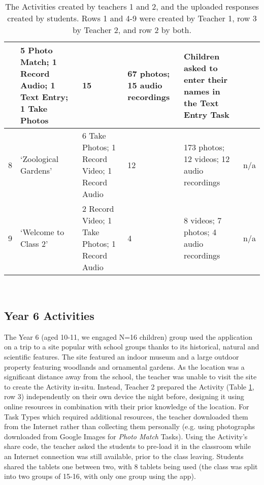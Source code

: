 \begin{table}[]
\begin{tabularx}{\linewidth}{ 
| p{3mm} 
| >{\raggedright\arraybackslash}X 
| >{\raggedright\arraybackslash}X 
| p{13mm}
| >{\raggedright\arraybackslash}X 
| >{\raggedright\arraybackslash}X 
|}
    & \footnotesize 5 Photo Match; 1 Record Audio; 1 Text Entry; 1 Take Photos
    & \footnotesize 15 
    & \footnotesize 67 photos; 15 audio recordings
    & \footnotesize Children asked to enter their names in the Text Entry Task\\
\hline
    \small 8 
    & \footnotesize `Zoological Gardens' 
    & \footnotesize 6 Take Photos; 1 Record Video; 1 Record Audio
    & \footnotesize 12 
    & \footnotesize 173 photos; 12 videos; 12 audio recordings
    & \footnotesize n/a\\
\hline
    \small 9 
    & \footnotesize `Welcome to Class 2' 
    & \footnotesize 2 Record Video; 1 Take Photos; 1 Record Audio
    & \footnotesize 4 
    & \footnotesize 8 videos; 7 photos; 4 audio recordings
    & \footnotesize n/a\\
\hline
\end{tabularx}
    \caption[The Activities created by teachers 1 and 2, and the uploaded responses created by students.]{The Activities created by teachers 1 and 2, and the uploaded responses created by students. Rows 1 and 4-9 were created by Teacher 1, row 3 by Teacher 2, and row 2 by both.}~\label{tab:TeacherActivities}
\end{table}

\subsection{Year 6 Activities}

The Year 6 (aged 10-11, we engaged N=16 children) group used the application on a trip to a site popular with school groups thanks to its historical, natural and scientific features. The site featured an indoor museum and a large outdoor property featuring woodlands and ornamental gardens. As the location was a significant distance away from the school, the teacher was unable to visit the site to create the Activity in-situ. Instead, Teacher 2 prepared the Activity (Table \ref{tab:TeacherActivities}, row 3) independently on their own device the night before, designing it using online resources in combination with their prior knowledge of the location. For Task Types which required additional resources, the teacher downloaded them from the Internet rather than collecting them personally (e.g. using photographs downloaded from Google Images for \textit{Photo Match} Tasks). Using the Activity's share code, the teacher asked the students to pre-load it in the classroom while an Internet connection was still available, prior to the class leaving. Students shared the tablets one between two, with 8 tablets being used (the class was split into two groups of 15-16, with only one group using the app). 

